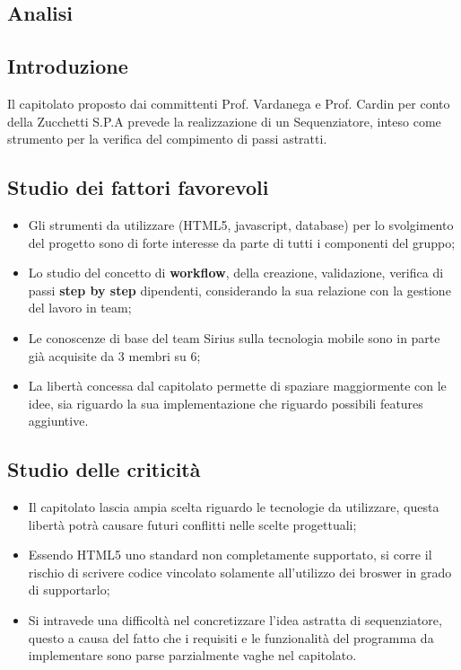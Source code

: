 \subsection{Analisi}
\subsection{Introduzione}
Il capitolato proposto dai committenti Prof. Vardanega e Prof. Cardin per conto della Zucchetti S.P.A prevede la realizzazione di un Sequenziatore, inteso come strumento per la verifica del compimento di passi astratti.
\subsection{Studio dei fattori favorevoli}
\begin{itemize}
\item Gli strumenti da utilizzare (HTML5, javascript, database) per lo svolgimento del progetto sono di forte interesse da parte di tutti i componenti del gruppo;
\item Lo studio del concetto di \textbf{workflow}, della creazione, validazione, verifica di passi \textbf{step by step} dipendenti, considerando la sua relazione con la gestione del lavoro in team;
\item Le conoscenze di base del team Sirius sulla tecnologia mobile sono in parte già acquisite da 3 membri su 6;
\item La libertà concessa dal capitolato permette di spaziare maggiormente con le idee, sia riguardo la sua implementazione che riguardo possibili features aggiuntive.
\end{itemize}
\subsection{Studio delle criticità}
\begin{itemize}
\item Il capitolato lascia ampia scelta riguardo le tecnologie da utilizzare, questa libertà potrà causare futuri conflitti nelle scelte progettuali;
\item Essendo HTML5 uno standard non completamente supportato, si corre il rischio di scrivere codice vincolato solamente all'utilizzo dei broswer in grado di supportarlo;
\item Si intravede una difficoltà nel concretizzare l'idea astratta di sequenziatore, questo a causa del fatto che i requisiti e le funzionalità del programma da implementare sono parse parzialmente vaghe nel capitolato.
\end{itemize}

